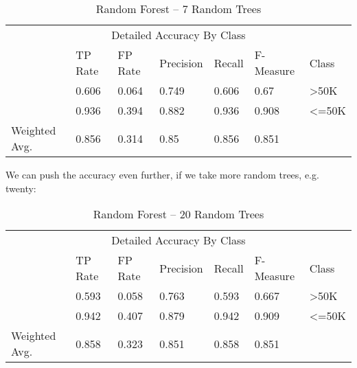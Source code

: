 \documentclass[paper=a4, fontsize=11pt]{scrartcl} %
\numberwithin{equation}{section} %
\numberwithin{figure}{section} %
\numberwithin{table}{section} %
\begin{document}
\begin{table*}[htb]\centering
  \begin{tabular*}{\columnwidth}{@{}lllllll@{}}
      \toprule 
      \multicolumn{7}{c}{Detailed Accuracy By Class} \\ 
              &  TP Rate & FP Rate & Precision & Recall & F-Measure & Class    \\  \midrule
              &  0.606   & 0.064   & 0.749     & 0.606  & 0.67      & >50K     \\ 
              &  0.936   & 0.394   & 0.882     & 0.936  & 0.908     & <=50K    \\ 
Weighted Avg. &  0.856   & 0.314   & 0.85      & 0.856  & 0.851     &          \\  \bottomrule
    \end{tabular*}
\caption{Random Forest -- 7 Random Trees} 
\label{tab:adult:rand:7t}
\end{table*}
\FloatBarrier
We can push the accuracy even further, if we take more random trees, e.g. twenty:
\begin{table*}[htb]\centering
  \begin{tabular*}{\columnwidth}{@{}lllllll@{}}
      \toprule 
      \multicolumn{7}{c}{Detailed Accuracy By Class} \\ 
                & TP Rate  & FP Rate  & Precision &  Recall &  F-Measure  & Class  \\  \midrule          
                & 0.593    & 0.058    & 0.763     &  0.593  &  0.667      & >50K   \\     
                & 0.942    & 0.407    & 0.879     &  0.942  &  0.909      & <=50K  \\     
Weighted Avg.   & 0.858    & 0.323    & 0.851     &  0.858  &  0.851      &        \\  \bottomrule
    \end{tabular*}
\caption{Random Forest -- 20 Random Trees} 
\label{tab:adult:rand:20t}
\end{table*}
\FloatBarrier
\end{document}
